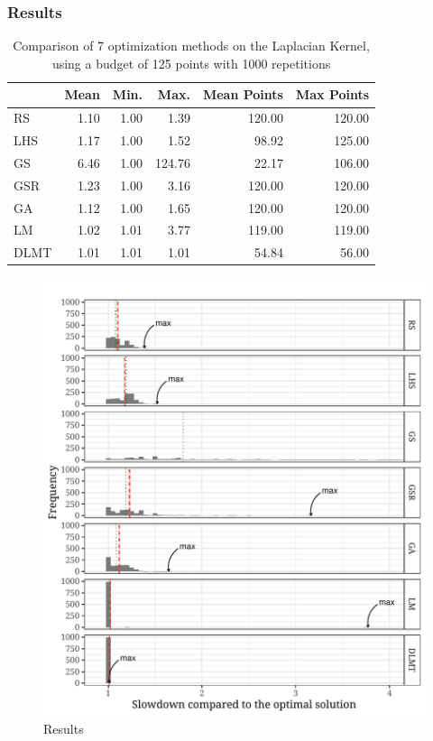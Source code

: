 \documentclass[conference]{IEEEtran}
\begin{document}
\subsubsection{Results}
\label{sec:org91864a7}
\begin{table}[ht]
\centering
\caption{Comparison of 7 optimization methods on the Laplacian Kernel, using a budget of 125 points with 1000 repetitions}
\begingroup\small
\begin{tabular}{lrrrrr}
  \toprule
 & Mean & Min. & Max. & Mean Points & Max Points \\
  \midrule
RS & 1.10 & 1.00 & 1.39 & 120.00 & 120.00 \\
  LHS & 1.17 & 1.00 & 1.52 & 98.92 & 125.00 \\
  GS & 6.46 & 1.00 & 124.76 & 22.17 & 106.00 \\
  GSR & 1.23 & 1.00 & 3.16 & 120.00 & 120.00 \\
  GA & 1.12 & 1.00 & 1.65 & 120.00 & 120.00 \\
  LM & 1.02 & 1.01 & 3.77 & 119.00 & 119.00 \\
  DLMT & 1.01 & 1.01 & 1.01 & 54.84 & 56.00 \\
   \bottomrule
\end{tabular}
\endgroup
\end{table}

\begin{center}
\begin{figure}[ht]
\centering
\includegraphics[width=.9\columnwidth]{./img/comparison_histogram.pdf}
\caption{Results}
\end{figure}
\end{center}
\end{document}
